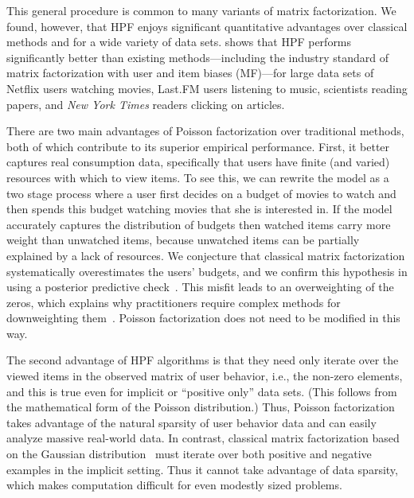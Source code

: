 This general procedure is common to many variants of matrix
factorization.  We found, however, that HPF enjoys significant
quantitative advantages over classical methods and for a wide variety
of data sets.  shows that HPF performs
significantly better than existing methods---including the industry
standard of matrix factorization with user and item biases (MF)---for
large data sets of Netflix users watching movies, Last.FM users
listening to music, scientists reading papers, and \textit{New York
  Times} readers clicking on articles.


There are two main advantages of Poisson factorization over
traditional methods, both of which contribute to its superior
empirical performance.  First, it better captures real consumption
data, specifically that users have finite (and varied) resources with
which to view items.  To see this, we can rewrite the model as a two
stage process where a user first decides on a budget of movies to
watch and then spends this budget watching movies that she is
interested in.  If the model accurately captures the distribution of
budgets then watched items carry more weight than unwatched items,
because unwatched items can be partially explained by a lack of
resources. We conjecture that classical matrix factorization
systematically overestimates the users' budgets, and we confirm this
hypothesis in  using a posterior predictive
check~\cite{Gelman:1996}.  This misfit leads to an overweighting of
the zeros, which explains why practitioners require complex methods
for downweighting
them~\cite{Hu:2008p9402,Gantner:2012p9364,Dror:2012a,Paquet:2013p9197}.
Poisson factorization does not need to be modified in this way.


The second advantage of HPF algorithms is that they need only iterate over the
viewed items in the observed matrix of user behavior, i.e., the non-zero
elements, and this is true even for implicit or ``positive only'' data sets.
(This follows from the mathematical form of the Poisson distribution.)  Thus,
Poisson factorization takes advantage of the natural sparsity of user behavior
data and can easily analyze massive real-world data. In contrast, classical
matrix factorization based on the Gaussian
distribution~\cite{Salakhutdinov:2008} must iterate over both positive and
negative examples in the implicit setting. Thus it cannot take advantage of
data sparsity, which makes computation difficult for even modestly sized
problems.

